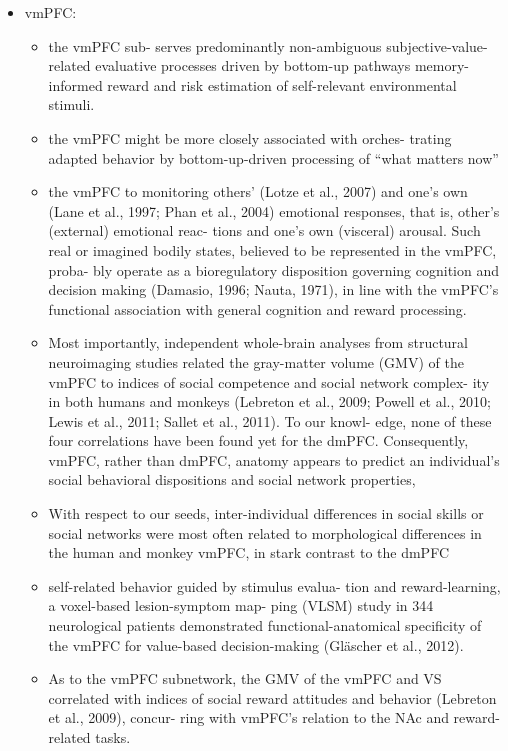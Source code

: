 \documentclass{article} %
\begin{document}
\begin{itemize}
  \item
    vmPFC:
    \begin{itemize}
    \item
the vmPFC sub- serves predominantly non-ambiguous subjective-value-related evaluative processes driven by bottom-up pathways
memory-informed reward and risk estimation of self-relevant environmental stimuli.
\item
the vmPFC might be more closely associated with orches- trating adapted behavior by bottom-up-driven processing of “what matters now”

\item
the vmPFC to monitoring others’ (Lotze et al., 2007) and one’s own (Lane et al., 1997; Phan et al., 2004) emotional responses, that is, other’s (external) emotional reac- tions and one’s own (visceral) arousal. Such real or imagined bodily states, believed to be represented in the vmPFC, proba- bly operate as a bioregulatory disposition governing cognition and decision making (Damasio, 1996; Nauta, 1971), in line with the vmPFC’s functional association with general cognition and reward processing.

\item
Most importantly, independent whole-brain analyses from structural neuroimaging studies related the gray-matter volume (GMV) of the vmPFC to indices of social competence and social network complex- ity in both humans and monkeys (Lebreton et al., 2009; Powell et al., 2010; Lewis et al., 2011; Sallet et al., 2011). To our knowl- edge, none of these four correlations have been found yet for the dmPFC. Consequently, vmPFC, rather than dmPFC, anatomy appears to predict an individual’s social behavioral dispositions and social network properties,

\item
With respect to our seeds, inter-individual differences in social skills or social networks were most often related to morphological differences in the human and monkey vmPFC, in stark contrast to the dmPFC

\item
self-related behavior guided by stimulus evalua- tion and reward-learning, a voxel-based lesion-symptom map- ping (VLSM) study in 344 neurological patients demonstrated functional-anatomical specificity of the vmPFC for value-based decision-making (Gläscher et al., 2012).


\item
As to the vmPFC subnetwork, the GMV of the vmPFC and VS correlated with indices of social reward attitudes and behavior (Lebreton et al., 2009), concur- ring with vmPFC’s relation to the NAc and reward-related tasks.


\end{itemize}
\end{itemize}
\end{document}
